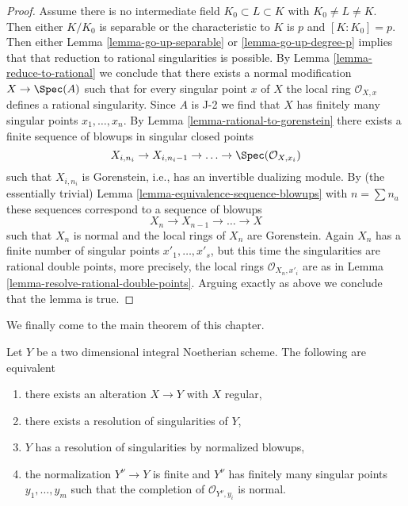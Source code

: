 \begin{proof}
\medskip\noindent
Assume there is no intermediate field $K_0 \subset L \subset K$
with $K_0 \not = L \not = K$. Then either $K/K_0$ is separable
or the characteristic to $K$ is $p$ and $[K : K_0] = p$.
Then either Lemma \ref{lemma-go-up-separable} or \ref{lemma-go-up-degree-p}
implies that that reduction to rational singularities is possible.
By Lemma \ref{lemma-reduce-to-rational} we conclude that there exists a
normal modification $X \to \Spec(A)$ such that for
every singular point $x$ of $X$ the local ring $\mathcal{O}_{X, x}$
defines a rational singularity. Since $A$ is J-2 we find that $X$ has
finitely many singular points $x_1, \ldots, x_n$.
By Lemma \ref{lemma-rational-to-gorenstein}
there exists a finite sequence of blowups in singular closed points
$$
X_{i, n_i} \to X_{i, n_i - 1} \to \ldots \to \Spec(\mathcal{O}_{X, x_i})
$$
such that $X_{i, n_i}$ is Gorenstein, i.e., has an
invertible dualizing module. By (the essentially trivial)
Lemma \ref{lemma-equivalence-sequence-blowups}
with $n = \sum n_a$ these sequences correspond to a sequence of
blowups
$$
X_n \to X_{n - 1} \to \ldots \to X
$$
such that $X_n$ is normal and the local rings of $X_n$ are Gorenstein.
Again $X_n$ has a finite number of singular points
$x'_1, \ldots, x'_s$, but this time the singularities are
rational double points, more precisely, the local rings
$\mathcal{O}_{X_n, x'_i}$ are as in
Lemma \ref{lemma-resolve-rational-double-points}.
Arguing exactly as above we conclude that the lemma is true.
\end{proof}

\noindent
We finally come to the main theorem of this chapter.

\begin{theorem}[Lipman]
\label{theorem-resolve}
\begin{reference}
\cite[Theorem on page 151]{Lipman}
\end{reference}
Let $Y$ be a two dimensional integral Noetherian scheme. The following are
equivalent
\begin{enumerate}
\item there exists an alteration $X \to Y$ with $X$ regular,
\item there exists a resolution of singularities of $Y$,
\item $Y$ has a resolution of singularities by normalized blowups,
\item the normalization $Y^\nu \to Y$ is finite and $Y^\nu$ has
finitely many singular points $y_1, \ldots, y_m$ such that the
completion of $\mathcal{O}_{Y^\nu, y_i}$ is normal.
\end{enumerate}
\end{theorem}

